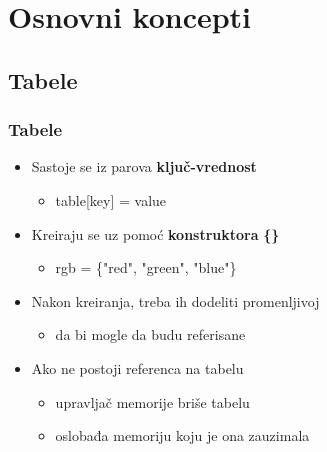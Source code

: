 \documentclass{beamer}
\begin{document}



\section{Osnovni koncepti}
\subsection{Tabele}
\begin{frame}
\frametitle{Tabele}
\begin{itemize}
\item Sastoje se iz parova \textbf{ključ-vrednost}
\begin{itemize}
\item \begin{semiverbatim} table[key] = value \end{semiverbatim}
\end{itemize}
\item Kreiraju se uz pomoć \textbf{konstruktora} \textbf{\{\}}
\begin{itemize}
\item \begin{semiverbatim} rgb = \{"red", "green", "blue"\} \end{semiverbatim}
\end{itemize}
\item Nakon kreiranja, treba ih dodeliti promenljivoj
\begin{itemize}
\item da bi mogle da budu referisane
\end{itemize}
\item Ako ne postoji referenca na tabelu
\begin{itemize}
\item upravljač memorije briše tabelu
\item oslobađa memoriju koju je ona zauzimala
\end{itemize}
\end{itemize}
\end{frame}

\end{document}
